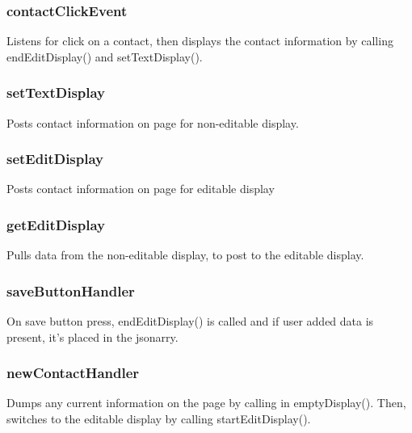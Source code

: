 \documentclass{article}
\begin{document}
\subsubsection{contactClickEvent}
Listens for click on a contact, then displays the contact information by calling endEditDisplay() and setTextDisplay().

\subsubsection{setTextDisplay}
Posts contact information on page for non-editable display.

\subsubsection{setEditDisplay}
Posts contact information on page for editable display

\subsubsection{getEditDisplay}
Pulls data from the non-editable display, to post to the editable display.

\subsubsection{saveButtonHandler}
On save button press, endEditDisplay() is called and if user added data is present, it's placed in the jsonarry.

\subsubsection{newContactHandler}
Dumps any current information on the page by calling in emptyDisplay(). Then, switches to the editable display by calling startEditDisplay().
\end{document}
